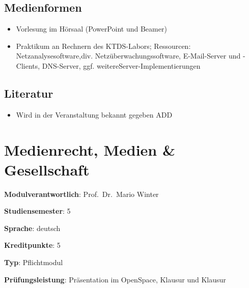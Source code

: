 \hypertarget{medienformenpathlabelmi-2017modulbeschreibungen-bachelorba_kommunikationstechnikundnetze}{%
\section*{Medienformen\label{/mi-2017/modulbeschreibungen-bachelor/BA_KommunikationstechnikundNetze}}\label{medienformenpathlabelmi-2017modulbeschreibungen-bachelorba_kommunikationstechnikundnetze}}

\begin{itemize}
\tightlist
\item
  Vorlesung im Hörsaal (PowerPoint und Beamer)
\item
  Praktikum an Rechnern des KTDS-Labors; Ressourcen:
  Netzanalysesoftware,div. Netzüberwachungssoftware, E-Mail-Server und
  -Clients, DNS-Server, ggf. weitereServer-Implementierungen
\end{itemize}

\hypertarget{literaturpathlabelmi-2017modulbeschreibungen-bachelorba_kommunikationstechnikundnetze}{%
\section*{Literatur\label{/mi-2017/modulbeschreibungen-bachelor/BA_KommunikationstechnikundNetze}}\label{literaturpathlabelmi-2017modulbeschreibungen-bachelorba_kommunikationstechnikundnetze}}

\begin{itemize}
\tightlist
\item
  Wird in der Veranstaltung bekannt gegeben ADD
\end{itemize}

\hypertarget{medienrecht-medien-gesellschaftpathlabelmi-2017modulbeschreibungen-bachelorba_mug}{%
\chapter{Medienrecht, Medien \&
Gesellschaft\label{/mi-2017/modulbeschreibungen-bachelor/BA_MUG}}\label{medienrecht-medien-gesellschaftpathlabelmi-2017modulbeschreibungen-bachelorba_mug}}

\begin{modulHead}
\textbf{Modulverantwortlich}: Prof.~Dr.~Mario
Winter
\end{modulHead}
\begin{modulHead}
\textbf{Studiensemester}:
5
\end{modulHead}
\begin{modulHead}
\textbf{Sprache}:
deutsch
\end{modulHead}
\begin{modulHead}
\textbf{Kreditpunkte}:
5
\end{modulHead}
\begin{modulHead}
\textbf{Typ}:
Pflichtmodul
\end{modulHead}
\begin{modulHead}
\textbf{Prüfungsleistung}:
Präsentation im OpenSpace, Klausur und Klausur
\end{modulHead}


